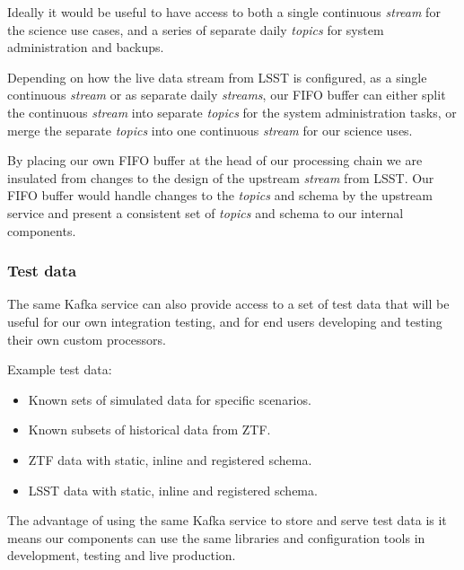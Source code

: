 \documentclass{article}
\newcommand{\kafka} {Kafka\xspace}
\newcommand{\kftopics} {\textit{topics}\xspace}
\newcommand{\kfstream} {\textit{stream}\xspace}
\newcommand{\kfstreams} {\textit{streams}\xspace}
\newcommand{\fifo} {FIFO\xspace}
\newcommand{\ztf} {ZTF\xspace}
\newcommand{\lsst} {LSST\xspace}
\begin{document}
Ideally it would be useful to have access to both a single continuous \kfstream for the science use cases, and a series of separate daily \kftopics for system administration and backups.

Depending on how the live data stream from \lsst is configured, as a single continuous \kfstream or as separate daily \kfstreams, our \fifo buffer can either split the continuous \kfstream into separate \kftopics for the system administration tasks, or merge the separate \kftopics into one continuous \kfstream for our science uses.

By placing our own \fifo buffer at the head of our processing chain we are insulated from changes to the design of the upstream \kfstream from \lsst.
Our \fifo buffer would handle changes to the \kftopics and schema by the upstream service and present a consistent set of \kftopics and schema to our internal components.

\subsubsection{Test data}
\label{stage-1.test-data}
The same \kafka service can also provide access to a set of test data that will be useful for our own integration testing, and for end users developing and testing their own custom processors.

Example test data:
\begin{itemize}
  \item Known sets of simulated data for specific scenarios.
  \item Known subsets of historical data from \ztf.
  \item \ztf data with static, inline and registered schema.
  \item \lsst data with static, inline and registered schema.
\end{itemize}

The advantage of using the same \kafka service to store and serve test data is it means our components can use the same libraries and configuration tools in development, testing and live production.
\end{document}
